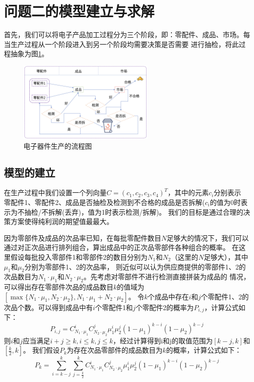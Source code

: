 \documentclass[withoutpreface,bwprint]{cumcmthesis} %
\begin{document}
\section{问题二的模型建立与求解}
首先，我们可以将电子产品加工过程分为三个阶段，即：零配件、成品、市场。每当生产过程从一个阶段进入到另一个阶段均需要决策是否需要
进行抽检，将此过程抽象为图\ref{fig:pro2}。
\begin{figure}[H]
    \centering
    \includegraphics[width=0.6\textwidth]{Fig/pro2.png}      %
    \caption{电子器件生产的流程图}
    \label{fig:pro2}
\end{figure}
\subsection{模型的建立}
在生产过程中我们设置一个列向量$C=(c_{1},c_{2},c_{3},c_{4})^{T}$，其中的元素$c_i$分别表示
零配件1、零配件2、成品是否抽检及检测到不合格的成品是否拆解($c_{i}$的值为0时表示为不抽检/不拆解(丢弃)，值为1时表示检测/拆解)。
我们的目标是通过合理的决策方案使得纯利润的期望值最最大。

因为零部件及成品的次品率已知，在每批零配件数目$N$足够大的情况下，我们可以通过对正次品进行排列组合，算出成品中的正次品零部件各种组合的概率。
在这里假设每批投入零部件1和零部件2的数目分别为$N_{1}$和$N_{2}$（这里的$N$足够大），其中$\mu_{1}$和$\mu_{2}$分别为零部件1、2的次品率，
则近似可以认为供应商提供的零部件1、2的次品数目为$N_{1}\cdot\mu_{1}$和$N_{2}\cdot\mu_{2}$。先考虑对零部件不进行检测直接拼装为成品的
情况，可以得出存在零部件次品的成品数目$k$的值域为$[\max \{N_{1}\cdot\mu_{1},N_{2}\cdot\mu_{2} \},N_{1}\cdot\mu_{1}+N_{2}\cdot\mu_{2}]$。
令$k$个成品中存在$i$和$j$个零配件1、2的次品个数。可以得到成品中有$i$个零配件1和$j$个零配件2的概率为$P_{i,j}$，计算公式如下：
\begin{equation}
    P_{i,j}=C_{N_{1}\cdot\mu_{1}}^{i}C_{N_{2}\cdot\mu_{2}}^{j}\mu_{1}^{i}\mu_{2}^{j}(1-\mu_{1})^{k-i}(1-\mu_{2})^{k-j}
    \label{eq:1}
\end{equation}
则$i$和$j$应当满足$i+j\ge k,i\le k,j\le k$，经过计算得到i和j的取值范围为$[k-j,k]$和$[\frac{k}{2},k]$。
我们假设$P_{k}$为存在次品零部件的成品数目为$k$的概率，计算公式如下：
\begin{equation}
    P_{k}=\sum_{i=k-j}^{k}\sum_{j=\frac{k}{2}}^{k}C_{N_{1}\cdot\mu_{1}}^{i}C_{N_{2}\cdot\mu_{2}}^{j}\mu_{1}^{i}\mu_{2}^{j}(1-\mu_{1})^{k-i}(1-\mu_{2})^{k-j}
    \label{eq:2}
\end{equation}
\end{document}
